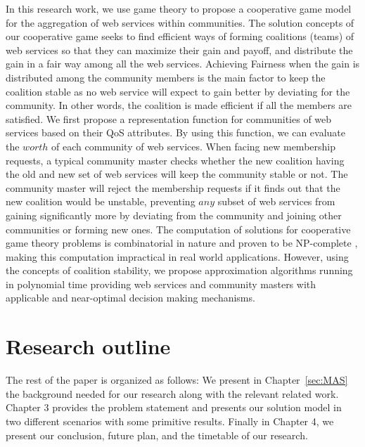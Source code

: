 In this research work, we use game theory to
propose a cooperative game model for the aggregation of web
services within communities. The solution concepts of our
cooperative game seeks to find efficient ways of forming
coalitions (teams) of web services so that they can maximize their
gain and payoff, and distribute the gain in a fair way among all
the web services. Achieving Fairness when the gain is distributed
among the community members is the main factor to keep the
coalition stable as no web service will expect to gain better by
deviating for the community. In other words, the coalition is made
efficient if all the members are satisfied. We first propose a
representation function for communities of web services based on
their QoS attributes. By using this function, we can evaluate the
$worth$ of each community of web services. When facing new
membership requests, a typical community master checks whether the
new coalition having the old and new set of web services will keep
the community stable or not. The community master will reject the
membership requests if it finds out that the new coalition would
be unstable, preventing $any$ subset of web services from gaining
significantly more by deviating from the community and joining
other communities or forming new ones. The computation of
solutions for cooperative game theory problems is combinatorial in
nature and proven to be NP-complete \cite{Algorithmic}, making
this computation impractical in real world applications. However,
using the concepts of coalition stability, we propose
approximation algorithms running in polynomial time providing web
services and community masters with applicable and near-optimal
decision making mechanisms.


\section{Research outline}\label{sec:outline}
The rest of the paper is organized as follows: We present in Chapter~\ref{sec:MAS} the background
needed for our research along with the relevant related work. Chapter 3 provides the problem statement and presents our solution model in two
different scenarios with some primitive results. Finally in Chapter 4, we present our conclusion, future plan, and the timetable of our research.

